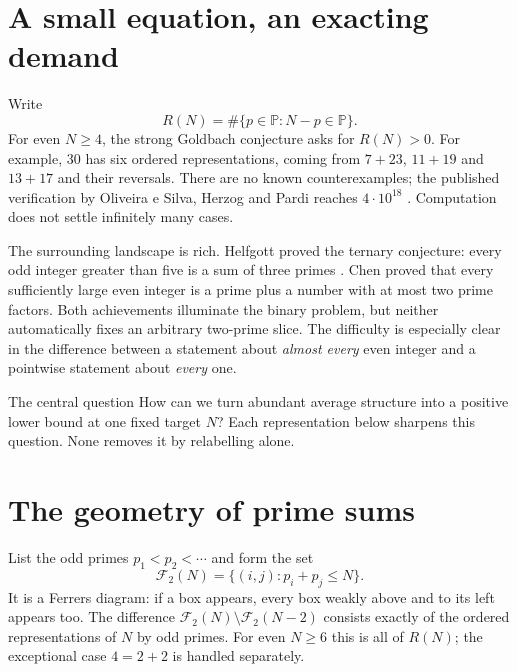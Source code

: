 \documentclass[11pt,a4paper]{article}
\newcommand{\PP}{\mathbb P}
\begin{document}
\section{A small equation, an exacting demand}
Write
\begin{equation}\label{eq:R}
 R(N)=\#\{p\in\PP: N-p\in\PP\}.
\end{equation}
For even $N\ge4$, the strong Goldbach conjecture asks for $R(N)>0$. For example, $30$ has six ordered representations, coming from $7+23$, $11+19$ and $13+17$ and their reversals. There are no known counterexamples; the published verification by Oliveira e Silva, Herzog and Pardi reaches $4\cdot 10^{18}$ \cite{verification}. Computation does not settle infinitely many cases.

The surrounding landscape is rich. Helfgott proved the ternary conjecture: every odd integer greater than five is a sum of three primes \cite{helfgott}. Chen proved that every sufficiently large even integer is a prime plus a number with at most two prime factors. Both achievements illuminate the binary problem, but neither automatically fixes an arbitrary two-prime slice. The difficulty is especially clear in the difference between a statement about \emph{almost every} even integer and a pointwise statement about \emph{every} one.

\begin{insight}{The central question}
How can we turn abundant average structure into a positive lower bound at one fixed target $N$? Each representation below sharpens this question. None removes it by relabelling alone.
\end{insight}

\section{The geometry of prime sums}
List the odd primes $p_1<p_2<\cdots$ and form the set
\begin{equation}\label{eq:ferrers}
 \mathcal F_2(N)=\{(i,j):p_i+p_j\le N\}.
\end{equation}
It is a Ferrers diagram: if a box appears, every box weakly above and to its left appears too. The difference $\mathcal F_2(N)\setminus\mathcal F_2(N-2)$ consists exactly of the ordered representations of $N$ by odd primes. For even $N\ge6$ this is all of $R(N)$; the exceptional case $4=2+2$ is handled separately.
\end{document}
